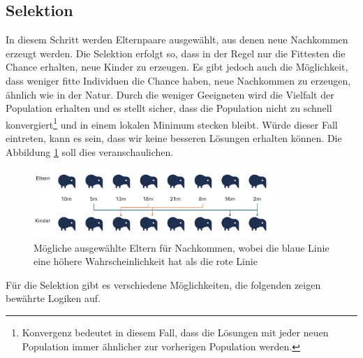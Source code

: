 %
%
%
%
\subsection{Selektion
\label{buch:paper:varalg:subsection:selection}}
In diesem Schritt werden Elternpaare ausgewählt, aus denen neue 
Nachkommen erzeugt werden. Die Selektion erfolgt so, dass in der 
Regel nur die Fittesten die Chance erhalten, neue Kinder zu erzeugen. 
Es gibt jedoch auch die Möglichkeit, dass weniger fitte Individuen die 
Chance haben, neue Nachkommen zu erzeugen, ähnlich wie in der Natur.
Durch die weniger Geeigneten wird die Vielfalt der Population erhalten
und es stellt sicher, dass die Population nicht zu schnell 
konvergiert\footnote{
    Konvergenz bedeutet in diesem Fall, dass die Lösungen mit jeder neuen 
    Population immer ähnlicher zur vorherigen Population werden.
    }
und in einem lokalen Minimum stecken bleibt. Würde dieser Fall eintreten, 
kann es sein, dass wir keine besseren Lösungen erhalten können. Die Abbildung
\ref{fig:selection_of_parents} soll dies veranschaulichen.
\begin{figure}
    \centering
    \includegraphics[width=0.8\textwidth]{
        papers/varalg/images/teil3/04OffspringProbability.png
    }
    \caption{
        Mögliche ausgewählte Eltern für Nachkommen, wobei die blaue Linie 
        eine höhere Wahrscheinlichkeit hat als die rote Linie}
    \label{fig:selection_of_parents}
\end{figure}
Für die Selektion gibt es verschiedene Möglichkeiten, die folgenden zeigen bewährte
Logiken auf.
